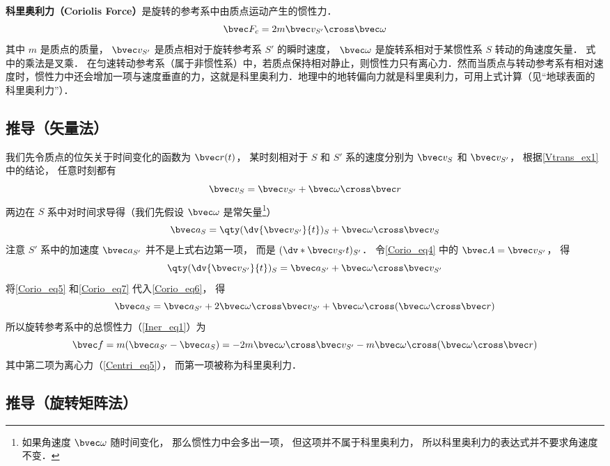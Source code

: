 

\textbf{科里奥利力（Coriolis Force）}是旋转的参考系中由质点运动产生的惯性力．
\begin{equation}
\bvec F_c = 2m \bvec v_{S'} \cross \bvec \omega
\end{equation}
其中 $m$ 是质点的质量， $\bvec v_{S'}$ 是质点相对于旋转参考系 $S'$ 的瞬时速度， $\bvec\omega$ 是旋转系相对于某惯性系 $S$ 转动的角速度矢量．%
式中的乘法是叉乘．
在匀速转动参考系（属于非惯性系）中，若质点保持相对静止，则惯性力只有离心力．然而当质点与转动参考系有相对速度时，惯性力中还会增加一项与速度垂直的力，这就是科里奥利力．地理中的地转偏向力就是科里奥利力，可用上式计算（见“地球表面的科里奥利力”）．

\subsection{推导（矢量法）}

我们先令质点的位矢关于时间变化的函数为 $\bvec r(t)$， 某时刻相对于 $S$ 和 $S'$ 系的速度分别为 $\bvec v_{S}$ 和 $\bvec v_{S'}$， 根据\autoref{Vtrans_ex1} 中的结论， 任意时刻都有
\begin{equation}\label{Corio_eq5}
\bvec v_{S} = \bvec v_{S'} + \bvec\omega\cross\bvec r
\end{equation}
两边在 $S$ 系中对时间求导得（我们先假设 $\bvec \omega$ 是常矢量\footnote{如果角速度 $\bvec \omega$ 随时间变化， 那么惯性力中会多出一项， 但这项并不属于科里奥利力， 所以科里奥利力的表达式并不要求角速度不变．}）
\begin{equation}\label{Corio_eq6}
\bvec a_{S} = \qty(\dv{\bvec v_{S'}}{t})_{S} + \bvec\omega\cross\bvec v_{S}
\end{equation}
注意 $S'$ 系中的加速度 $\bvec a_{S'}$ 并不是上式右边第一项， 而是 $(\dv*{\bvec v_{S'}}{t})_{S'}$． 令\autoref{Corio_eq4} 中的 $\bvec A = \bvec v_{S'}$， 得
\begin{equation}\label{Corio_eq7}
\qty(\dv{\bvec v_{S'}}{t})_{S} = \bvec a_{S'} + \bvec\omega\cross\bvec v_{S'}
\end{equation}
将\autoref{Corio_eq5} 和\autoref{Corio_eq7} 代入\autoref{Corio_eq6}， 得
\begin{equation}
\bvec a_{S} = \bvec a_{S'} + 2\bvec\omega\cross\bvec v_{S'} + \bvec\omega\cross(\bvec\omega\cross\bvec r)
\end{equation}
所以旋转参考系中的总惯性力（\autoref{Iner_eq1}）为
\begin{equation}
\bvec f = m(\bvec a_{S'} - \bvec a_{S}) = -2m\bvec\omega\cross\bvec v_{S'} - m\bvec\omega\cross(\bvec\omega\cross\bvec r)
\end{equation}
其中第二项为离心力（\autoref{Centri_eq5}）， 而第一项被称为科里奥利力．

\subsection{推导（旋转矩阵法）}

